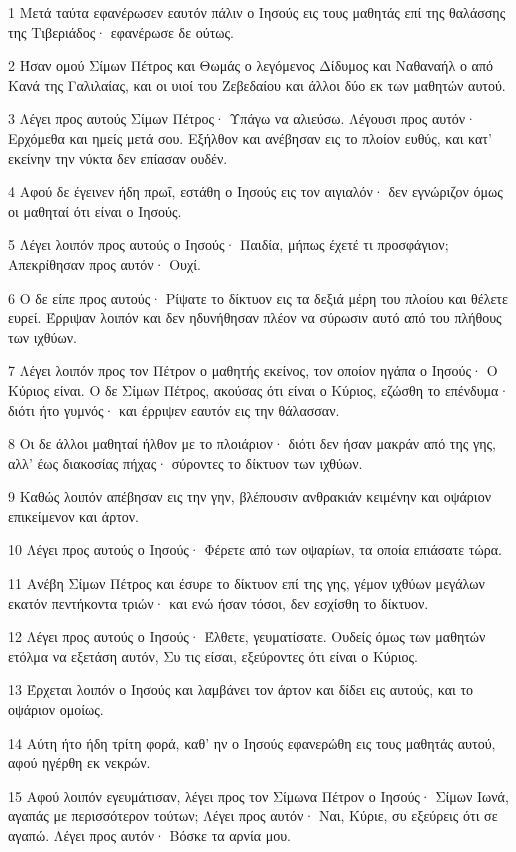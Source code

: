 \par 1 Μετά ταύτα εφανέρωσεν εαυτόν πάλιν ο Ιησούς εις τους μαθητάς επί της θαλάσσης της Τιβεριάδος· εφανέρωσε δε ούτως.
\par 2 Ήσαν ομού Σίμων Πέτρος και Θωμάς ο λεγόμενος Δίδυμος και Ναθαναήλ ο από Κανά της Γαλιλαίας, και οι υιοί του Ζεβεδαίου και άλλοι δύο εκ των μαθητών αυτού.
\par 3 Λέγει προς αυτούς Σίμων Πέτρος· Υπάγω να αλιεύσω. Λέγουσι προς αυτόν· Ερχόμεθα και ημείς μετά σου. Εξήλθον και ανέβησαν εις το πλοίον ευθύς, και κατ' εκείνην την νύκτα δεν επίασαν ουδέν.
\par 4 Αφού δε έγεινεν ήδη πρωΐ, εστάθη ο Ιησούς εις τον αιγιαλόν· δεν εγνώριζον όμως οι μαθηταί ότι είναι ο Ιησούς.
\par 5 Λέγει λοιπόν προς αυτούς ο Ιησούς· Παιδία, μήπως έχετέ τι προσφάγιον; Απεκρίθησαν προς αυτόν· Ουχί.
\par 6 Ο δε είπε προς αυτούς· Ρίψατε το δίκτυον εις τα δεξιά μέρη του πλοίου και θέλετε ευρεί. Έρριψαν λοιπόν και δεν ηδυνήθησαν πλέον να σύρωσιν αυτό από του πλήθους των ιχθύων.
\par 7 Λέγει λοιπόν προς τον Πέτρον ο μαθητής εκείνος, τον οποίον ηγάπα ο Ιησούς· Ο Κύριος είναι. Ο δε Σίμων Πέτρος, ακούσας ότι είναι ο Κύριος, εζώσθη το επένδυμα· διότι ήτο γυμνός· και έρριψεν εαυτόν εις την θάλασσαν.
\par 8 Οι δε άλλοι μαθηταί ήλθον με το πλοιάριον· διότι δεν ήσαν μακράν από της γης, αλλ' έως διακοσίας πήχας· σύροντες το δίκτυον των ιχθύων.
\par 9 Καθώς λοιπόν απέβησαν εις την γην, βλέπουσιν ανθρακιάν κειμένην και οψάριον επικείμενον και άρτον.
\par 10 Λέγει προς αυτούς ο Ιησούς· Φέρετε από των οψαρίων, τα οποία επιάσατε τώρα.
\par 11 Ανέβη Σίμων Πέτρος και έσυρε το δίκτυον επί της γης, γέμον ιχθύων μεγάλων εκατόν πεντήκοντα τριών· και ενώ ήσαν τόσοι, δεν εσχίσθη το δίκτυον.
\par 12 Λέγει προς αυτούς ο Ιησούς· Έλθετε, γευματίσατε. Ουδείς όμως των μαθητών ετόλμα να εξετάση αυτόν, Συ τις είσαι, εξεύροντες ότι είναι ο Κύριος.
\par 13 Έρχεται λοιπόν ο Ιησούς και λαμβάνει τον άρτον και δίδει εις αυτούς, και το οψάριον ομοίως.
\par 14 Αύτη ήτο ήδη τρίτη φορά, καθ' ην ο Ιησούς εφανερώθη εις τους μαθητάς αυτού, αφού ηγέρθη εκ νεκρών.
\par 15 Αφού λοιπόν εγευμάτισαν, λέγει προς τον Σίμωνα Πέτρον ο Ιησούς· Σίμων Ιωνά, αγαπάς με περισσότερον τούτων; Λέγει προς αυτόν· Ναι, Κύριε, συ εξεύρεις ότι σε αγαπώ. Λέγει προς αυτόν· Βόσκε τα αρνία μου.
